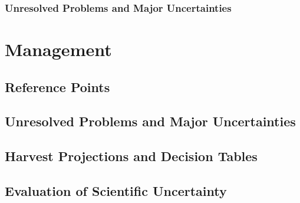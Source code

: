 \documentclass[11pt,
  english,
  a4paper,
]{article}
\begin{document}

\hypertarget{unresolved-problems-and-major-uncertainties-1}{%
\subsubsection{Unresolved Problems and Major Uncertainties}\label{unresolved-problems-and-major-uncertainties-1}}

\leavevmode\tagmcend\tagstructend


\hypertarget{management}{%
\section{Management}\label{management}}

\leavevmode\tagmcend\tagstructend


\hypertarget{reference-points-3}{%
\subsection{Reference Points}\label{reference-points-3}}

\leavevmode\tagmcend\tagstructend


\hypertarget{unresolved-problems-and-major-uncertainties-2}{%
\subsection{Unresolved Problems and Major Uncertainties}\label{unresolved-problems-and-major-uncertainties-2}}

\leavevmode\tagmcend\tagstructend


\hypertarget{harvest-projections-and-decision-tables}{%
\subsection{Harvest Projections and Decision Tables}\label{harvest-projections-and-decision-tables}}

\leavevmode\tagmcend\tagstructend


\hypertarget{evaluation-of-scientific-uncertainty}{%
\subsection{Evaluation of Scientific Uncertainty}\label{evaluation-of-scientific-uncertainty}}
\end{document}
